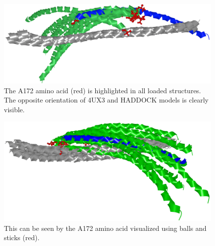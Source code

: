 \documentclass{bmcart}
\begin{document}
\begin{backmatter}
\begin{figure}[h!]
  \centering
  \includegraphics[width=\columnwidth]{images/figure11.png}
  \caption{ The A172 amino acid (red) is highlighted in all loaded structures. The opposite orientation of 4UX3 and HADDOCK models is clearly visible.}
  \label{fig:coiled_haddock}
\end{figure}

\begin{figure}[h!]
  \centering
  \includegraphics[width=\columnwidth]{images/figure12.png}
  \caption{ This can be seen by the A172 amino acid visualized using balls and sticks (red).}
  \label{fig:selection2SMC3PyDock}
\end{figure}


\end{backmatter}
\end{document}
